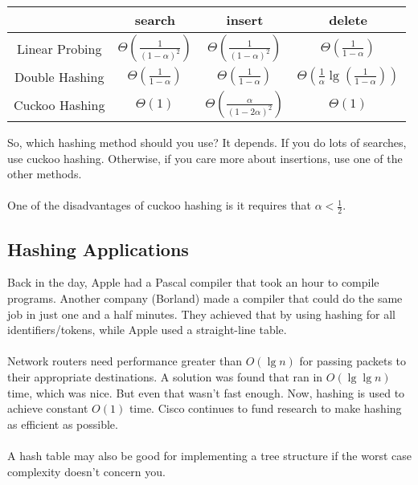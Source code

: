 \documentclass[]{article}
\theoremstyle{definition}
\begin{document}
					\begin{center}
						\begin{tabular}{|c|c|c|c|}
							\hline
							& search & insert & delete \\ \hline
							Linear Probing & $\Theta \left( \frac{1}{(1 - \alpha)^2} \right)$ & $\Theta \left( \frac{1}{(1 - \alpha)^2} \right)$ & $\Theta \left( \frac{1}{1 - \alpha} \right)$ \\ \hline
							Double Hashing & $\Theta \left( \frac{1}{1 - \alpha} \right)$ & $\Theta \left( \frac{1}{1 - \alpha} \right)$ & $\Theta \left( \frac{1}{\alpha} \lg \left( \frac{1}{1 - \alpha} \right) \right)$ \\ \hline
							Cuckoo Hashing & $\Theta \left( 1 \right)$ & $\Theta \left( \frac{\alpha}{(1 - 2 \alpha)^2} \right)$ & $\Theta \left( 1 \right)$ \\ \hline
						\end{tabular}
					\end{center}

					So, which hashing method should you use? It depends. If you do lots of searches, use cuckoo hashing. Otherwise, if you care more about insertions, use one of the other methods.
					\\ \\
					One of the disadvantages of cuckoo hashing is it requires that $\alpha < \frac{1}{2}$.
				
		\subsection{Hashing Applications}
        Back in the day, Apple had a Pascal compiler that took an hour to compile programs. Another company (Borland) made a compiler that could do the same job in just one and a half minutes. They achieved that by using hashing for all identifiers/tokens, while Apple used a straight-line table.
			\\ \\
			Network routers need performance greater than $O(\lg n)$ for passing packets to their appropriate destinations. A solution was found that ran in $O(\lg \lg n)$ time, which was nice. But even that wasn't fast enough. Now, hashing is used to achieve constant $O(1)$ time. Cisco continues to fund research to make hashing as efficient as possible.
			\\ \\
			A hash table may also be good for implementing a tree structure if the worst case complexity doesn't concern you.
		
\end{document}
